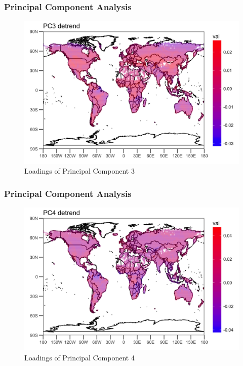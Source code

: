 \documentclass{beamer}
\begin{document}
\begin{frame}
\frametitle{Principal Component Analysis}
\begin{figure}
	\centering
	\includegraphics[width=0.9\linewidth]{../img/loading_PC3_de}
	\caption{Loadings of Principal Component 3}
	\label{fig:loadingpc3}
\end{figure}
\end{frame}

\begin{frame}
\frametitle{Principal Component Analysis}
\begin{figure}
	\centering
	\includegraphics[width=0.9\linewidth]{../img/loading_PC4_de}
	\caption{Loadings of Principal Component 4}
	\label{fig:loadingpc4}
\end{figure}
\end{frame}
\end{document}
